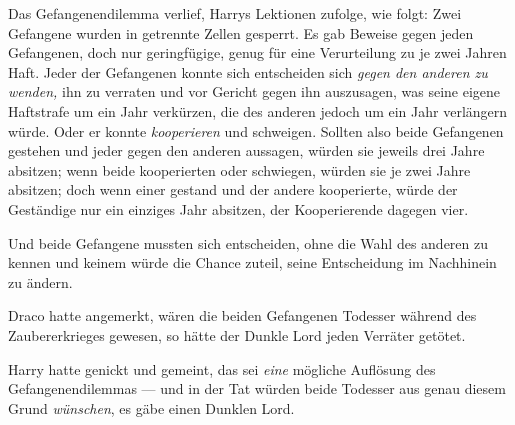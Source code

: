 Das Gefangenendilemma verlief, Harrys Lektionen zufolge, wie folgt: Zwei Gefangene wurden in getrennte Zellen gesperrt. Es gab Beweise gegen jeden Gefangenen, doch nur geringfügige, genug für eine Verurteilung zu je zwei Jahren Haft. Jeder der Gefangenen konnte sich entscheiden sich \emph{gegen den anderen zu wenden,} ihn zu verraten und vor Gericht gegen ihn auszusagen, was seine eigene Haftstrafe um ein Jahr verkürzen, die des anderen jedoch um ein Jahr verlängern würde. Oder er konnte \emph{kooperieren} und schweigen. Sollten also beide Gefangenen gestehen und jeder gegen den anderen aussagen, würden sie jeweils drei Jahre absitzen; wenn beide kooperierten oder schwiegen, würden sie je zwei Jahre absitzen; doch wenn einer gestand und der andere kooperierte, würde der Geständige nur ein einziges Jahr absitzen, der Kooperierende dagegen vier.

Und beide Gefangene mussten sich entscheiden, ohne die Wahl des anderen zu kennen und keinem würde die Chance zuteil, seine Entscheidung im Nachhinein zu ändern.

Draco hatte angemerkt, wären die beiden Gefangenen Todesser während des Zaubererkrieges gewesen, so hätte der Dunkle Lord jeden Verräter getötet.

Harry hatte genickt und gemeint, das sei \emph{eine} mögliche Auflösung des Gefangenendilemmas — und in der Tat würden beide Todesser aus genau diesem Grund \emph{wünschen}, es gäbe einen Dunklen Lord.

